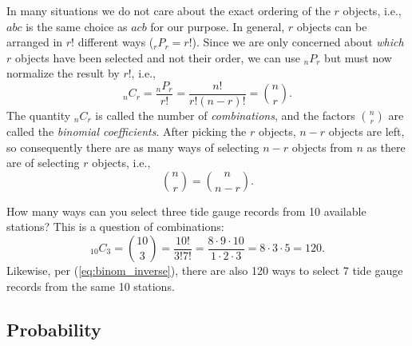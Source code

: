 	In many situations we do not care about the exact ordering of the $r$ objects, i.e., $abc$ is the 
same choice as $acb$ for our purpose.  In general, $r$ objects can be arranged in $r!$ different ways 
($_{r}P_r = r!$).  Since we are only concerned about \emph{which} $r$ objects have been selected and not their 
order, we can use ${}_nP_r$ but must now normalize the result by $r!$, i.e., 
\begin{equation}
_{n} C_{r} = \frac{_{n} P_{r}}{r!} = \frac{n!}{r!(n-r)!} = \binom{n}{r}.
\end{equation}
The quantity $_{n} C_{r}$ is called the number of \emph{combinations}, and
the factors $\binom{n}{r}$ are called the 
\emph{binomial coefficients}.
After picking the $r$ objects, $n - r$ objects are left, so consequently there are as many ways of 
selecting $n - r$ objects from $n$ as there are of selecting $r$ objects, i.e.,
\begin{equation}
\binom{n}{r} = \binom{n}{n-r}.
\label{eq:binom_inverse}
\end{equation}
\begin{example}
How many ways can you select three tide gauge records from 10 available stations?
This is a question of combinations:
\begin{equation}
{}_{10} C_3 = \binom{10}{3} =
\frac{10!}{3!7!} = \frac{8\cdot 9 \cdot 10}{1\cdot 2 \cdot 3} = 8 \cdot 3 \cdot 5 = 120.
\end{equation}	
Likewise, per (\ref{eq:binom_inverse}), there are also 120 ways to select 7 tide gauge records from the same 10 stations. 
\end{example}

\subsection{Probability}

